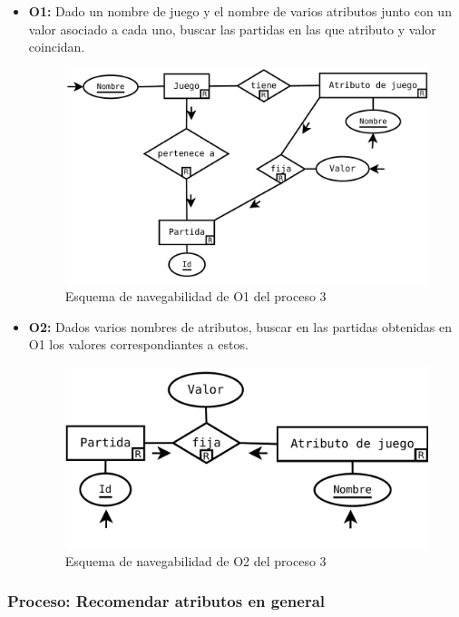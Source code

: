 \begin{itemize}
	\item \textbf{O1:} Dado un nombre de juego y el nombre de varios
		atributos junto con un valor asociado a cada uno, 
		buscar las partidas en las que atributo y valor coincidan.\\

	\begin{figure}[H]
		\centering
		\includegraphics[width=0.5\linewidth]{../Diagramas/pdf/Consejos/Op3-1.pdf}
		\caption{Esquema de navegabilidad de O1 del proceso 3}
	\end{figure}


	\item \textbf{O2:} Dados varios nombres de atributos, buscar en las
		partidas obtenidas en O1 los valores correspondiantes a
		estos.\\

	\begin{figure}[H]
		\centering
		\includegraphics[width=0.5\linewidth]{../Diagramas/pdf/Consejos/Op3-2.pdf}
		\caption{Esquema de navegabilidad de O2 del proceso 3}
	\end{figure}
\end{itemize}





\subsubsection{Proceso: Recomendar atributos en general}

